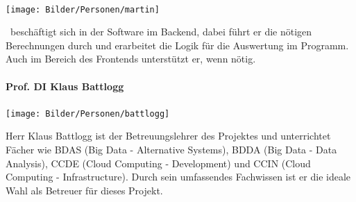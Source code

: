 \paragraph{\schneider}
\begin{minipage}{0.37\textwidth}
	\centering
	\texttt{[image: Bilder/Personen/martin]}
\end{minipage}
\hfill
\begin{minipage}{0.6\textwidth}
    \schneider \ beschäftigt sich in der Software im Backend, dabei führt er die nötigen Berechnungen durch und erarbeitet die Logik für die Auswertung im Programm. Auch im Bereich des Frontends unterstützt er, wenn nötig.
\end{minipage}%
\vspace{1ex}

\paragraph{Prof. DI Klaus Battlogg}
\begin{minipage}{0.37\textwidth}
	\centering
	\texttt{[image: Bilder/Personen/battlogg]}
\end{minipage}
\hfill
\begin{minipage}{0.6\textwidth}
	Herr Klaus Battlogg ist der Betreuungslehrer des Projektes und unterrichtet Fächer wie BDAS (Big Data - Alternative Systems), BDDA (Big Data - Data Analysis), CCDE (Cloud Computing - Development) und CCIN (Cloud Computing - Infrastructure). Durch sein umfassendes Fachwissen ist er die ideale Wahl als Betreuer für dieses Projekt.
\end{minipage}%
\vspace{1ex}

